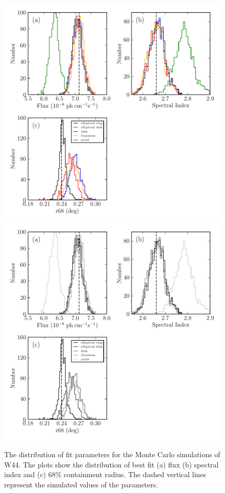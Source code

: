 \begin{figure}[htbp]
    \ifcolorfigure
    \includegraphics{mc_plots/bias_w44sim_color.pdf}
    \else
    \includegraphics{mc_plots/bias_w44sim_bw.pdf}
    \fi
    \caption{
    The distribution of fit parameters
    for the Monte Carlo simulations of W44.
    The plots show the distribution of 
    best fit (a) flux (b) spectral index and (c) 68\% containment
    radius. The dashed vertical lines represent
    the simulated values of the parameters.
    }
\end{figure}



